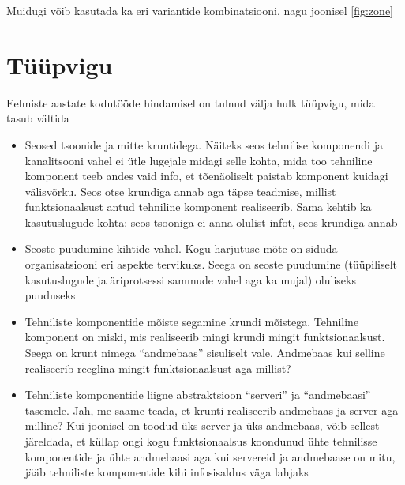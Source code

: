 \documentclass[nobib]{tufte-handout}
\begin{document}
Muidugi võib kasutada ka eri variantide kombinatsiooni, nagu joonisel \ref{fig:zone}


\section{Tüüpvigu}
Eelmiste aastate kodutööde hindamisel on tulnud välja hulk tüüpvigu, mida tasub vältida
\begin{itemize}
	\item Seosed tsoonide ja mitte kruntidega. Näiteks seos tehnilise komponendi ja kanalitsooni vahel ei ütle lugejale midagi selle kohta, mida too tehniline komponent teeb andes vaid info, et tõenäoliselt paistab komponent kuidagi välisvõrku. Seos otse krundiga annab aga täpse teadmise, millist funktsionaalsust antud tehniline komponent realiseerib. Sama kehtib ka kasutuslugude kohta: seos tsooniga ei anna olulist infot, seos krundiga annab
	\item Seoste puudumine kihtide vahel. Kogu harjutuse mõte on siduda organisatsiooni eri aspekte tervikuks. Seega on seoste puudumine (tüüpiliselt kasutuslugude ja äriprotsessi sammude vahel aga ka mujal) oluliseks puuduseks
	\item Tehniliste komponentide mõiste segamine krundi mõistega. Tehniline komponent on miski, mis realiseerib mingi krundi mingit funktsionaalsust. Seega on krunt nimega \enquote{andmebaas} sisuliselt vale. Andmebaas kui selline realiseerib reeglina mingit funktsionaalsust aga millist?
	\item Tehniliste komponentide liigne abstraktsioon \enquote{serveri} ja \enquote{andmebaasi} tasemele. Jah, me saame teada, et krunti realiseerib andmebaas ja server aga milline? Kui joonisel on toodud üks server ja üks andmebaas, võib sellest järeldada, et küllap ongi kogu funktsionaalsus koondunud ühte tehnilisse komponentide ja ühte andmebaasi aga kui servereid ja andmebaase on mitu, jääb tehniliste komponentide kihi infosisaldus väga lahjaks
\end{itemize}



\end{document}
